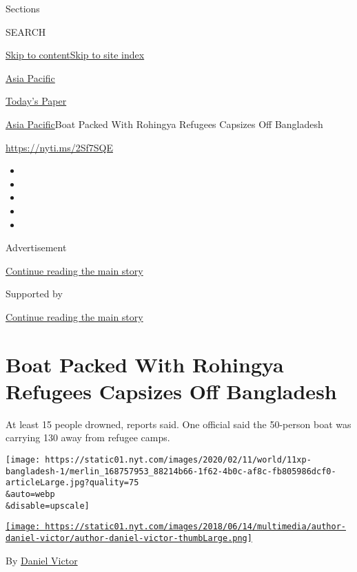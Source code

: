 Sections

SEARCH

\protect\hyperlink{site-content}{Skip to
content}\protect\hyperlink{site-index}{Skip to site index}

\href{https://www.nytimes.com/section/world/asia}{Asia Pacific}

\href{https://myaccount.nytimes.com/auth/login?response_type=cookie\&client_id=vi}{}

\href{https://www.nytimes.com/section/todayspaper}{Today's Paper}

\href{/section/world/asia}{Asia Pacific}\textbar{}Boat Packed With
Rohingya Refugees Capsizes Off Bangladesh

\url{https://nyti.ms/2Sf7SQE}

\begin{itemize}
\item
\item
\item
\item
\item
\end{itemize}

Advertisement

\protect\hyperlink{after-top}{Continue reading the main story}

Supported by

\protect\hyperlink{after-sponsor}{Continue reading the main story}

\hypertarget{boat-packed-with-rohingya-refugees-capsizes-off-bangladesh}{%
\section{Boat Packed With Rohingya Refugees Capsizes Off
Bangladesh}\label{boat-packed-with-rohingya-refugees-capsizes-off-bangladesh}}

At least 15 people drowned, reports said. One official said the
50-person boat was carrying 130 away from refugee camps.

\texttt{[image: https://static01.nyt.com/images/2020/02/11/world/11xp-bangladesh-1/merlin\_168757953\_88214b66-1f62-4b0c-af8c-fb805986dcf0-articleLarge.jpg?quality=75\\\&auto=webp\\\&disable=upscale]}

\href{https://www.nytimes.com/by/daniel-victor}{\texttt{[image: https://static01.nyt.com/images/2018/06/14/multimedia/author-daniel-victor/author-daniel-victor-thumbLarge.png]}}

By \href{https://www.nytimes.com/by/daniel-victor}{Daniel Victor}


